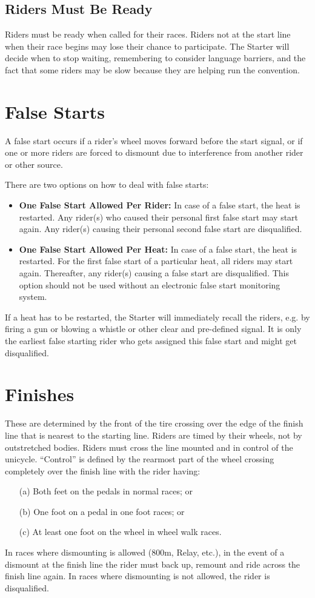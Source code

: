 \subsection{Riders Must Be Ready}
Riders must be ready when called for their races.
Riders not at the start line when their race begins may lose their chance to participate.
The Starter will decide when to stop waiting, remembering to consider language barriers, and the fact that some riders may be slow because they are helping run the convention.

\section{False Starts}
A false start occurs if a rider's wheel moves forward before the start signal, or if one or more riders are forced to dismount due to interference from another rider or other source.

There are two options on how to deal with false starts:
\begin{itemize}
\item \textbf{One False Start Allowed Per Rider:}
In case of a false start, the heat is restarted.
Any rider(s) who caused their personal first false start may start again.
Any rider(s) causing their personal second false start are disqualified.
\item \textbf{One False Start Allowed Per Heat:} 
In case of a false start, the heat is restarted.
For the first false start of a particular heat, all riders may start again.
Thereafter, any rider(s) causing a false start are disqualified.
This option should not be used without an electronic false start monitoring system.
\end{itemize}
If a heat has to be restarted, the Starter will immediately recall the riders, e.g. by firing a gun or blowing a whistle or other clear and pre-defined signal.
It is only the earliest false starting rider who gets assigned this false start and might get disqualified.

\section{Finishes \label{sec:track-field_finishes}}
These are determined by the front of the tire crossing over the edge of the finish line that is nearest to the starting line.
Riders are timed by their wheels, not by outstretched bodies.
Riders must cross the line mounted and in control of the unicycle.
``Control'' is defined by the rearmost part of the wheel crossing completely over the finish line with the rider having: 
\begin{enumerate}
\item[(a)] Both feet on the pedals in normal races; or 
\item[(b)] One foot on a pedal in one foot races; or 
\item[(c)] At least one foot on the wheel in wheel walk races.
\end{enumerate}
In races where dismounting is allowed (800m, Relay, etc.), in the event of a dismount at the finish line the rider must back up, remount and ride across the finish line again.
In races where dismounting is not allowed, the rider is disqualified.

